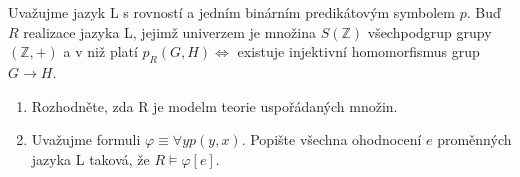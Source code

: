 \subsubsection{}
Uvažujme jazyk L s rovností a jedním binárním predikátovým symbolem $p$. Buď $R$
realizace jazyka L, jejimž univerzem je množina $S(\mathbb{Z})$ všechpodgrup
grupy $(\mathbb{Z}, +)$ a v niž platí $p_{R}(G,H) \Leftrightarrow$ existuje
injektivní homomorfismus grup $G\rightarrow H$.
\begin{enumerate}[1.]
  \item Rozhodněte, zda R je modelm teorie uspořádaných množin.
  \item Uvažujme formuli $\varphi \equiv \forall y p(y,x)$. Popište všechna
  ohodnocení $e$ proměnných jazyka L taková, že $R \models \varphi [e]$.
\end{enumerate}

